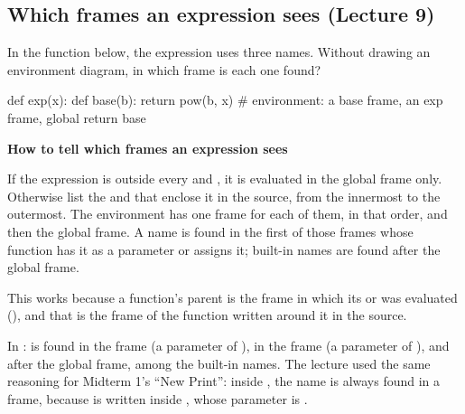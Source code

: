 \documentclass[10pt]{scrartcl}
\newenvironment{howto}[1]{\begin{mdframed}[style=howtostyle]{\color{NavyBlue}\textbf{#1}}\par\vspace{2pt}}{\end{mdframed}}
\begin{document}
\subsection{Which frames an expression sees (Lecture 9)}
\begin{qbox}
  In the function below, the expression  uses three names. Without drawing an environment diagram, in which frame is each one found?
\end{qbox}
\begin{py}
def exp(x):
    def base(b):
        return pow(b, x)     # environment: a base frame, an exp frame, global
    return base
\end{py}
\begin{howto}{How to tell which frames an expression sees}
\begin{steps}
  \ii If the expression is outside every  and , it is evaluated in the global frame only.
  \ii Otherwise list the  and  that enclose it in the source, from the innermost to the outermost. The environment has one frame for each of them, in that order, and then the global frame.
  \ii A name is found in the first of those frames whose function has it as a parameter or assigns it; built-in names are found after the global frame.
\end{steps}
\end{howto}
This works because a function's parent is the frame in which its  or  was evaluated (), and that is the frame of the function written around it in the source.

\revisit In :  is found in the  frame (a parameter of ),  in the  frame (a parameter of ), and  after the global frame, among the built-in names. The lecture used the same reasoning for Midterm 1's ``New Print'': inside , the name  is always found in a  frame, because  is written inside , whose parameter is .
\end{document}
